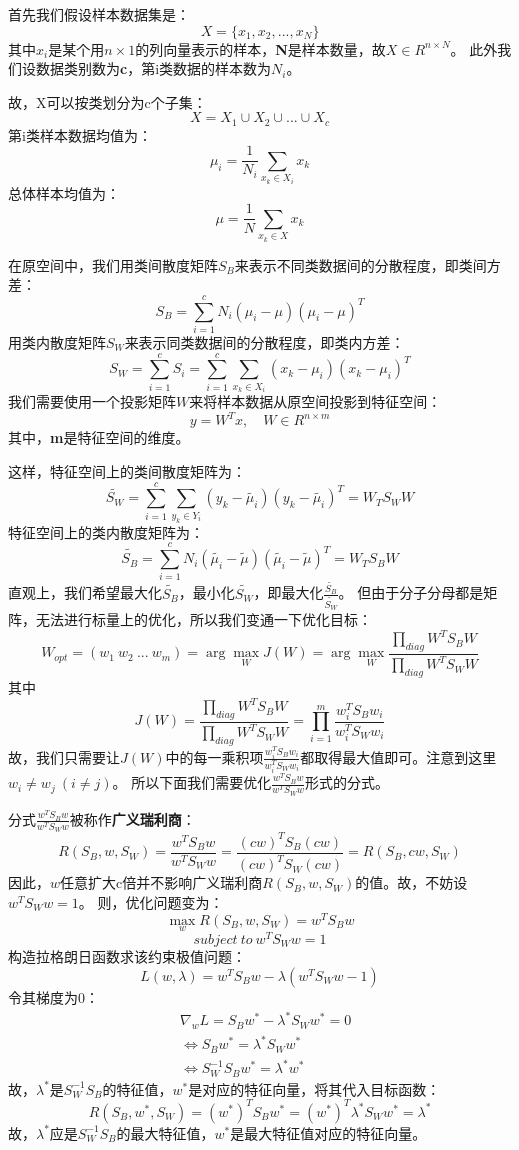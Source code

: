 \documentclass{ctexart}
\begin{document}
\noindent
首先我们假设样本数据集是：
$$
    X=\{x_1,x_2,...,x_N\}
$$
其中\textbf{$x_i$}是某个用$n\times1$的列向量表示的样本，\textbf{N}是样本数量，故$X\in R^{n\times N}$。
此外我们设数据类别数为\textbf{c}，第i类数据的样本数为\textbf{$N_i$}。

\noindent
故，X可以按类划分为c个子集：
$$
    X=X_1\cup X_2\cup ...\cup X_c
$$
第i类样本数据均值为：
$$
    \mu_i=\frac{1}{N_i}\sum_{x_k\in X_i}x_k
$$
总体样本均值为：
$$
    \mu=\frac{1}{N}\sum_{x_k\in X}x_k
$$

\noindent
在原空间中，我们用类间散度矩阵$S_B$来表示不同类数据间的分散程度，即类间方差：
$$
    S_{B}=\sum_{i=1}^{c} N_{i}\left(\mu_{i}-\mu\right)\left(\mu_{i}-\mu\right)^{T}
$$
用类内散度矩阵$S_W$来表示同类数据间的分散程度，即类内方差：
$$
    S_{W}=\sum_{i=1}^{c} S_{i}=\sum_{i=1}^{c} \sum_{x_{k} \in X_{i}}\left(x_{k}-\mu_{i}\right)\left(x_{k}-\mu_{i}\right)^{T}
$$
我们需要使用一个投影矩阵$W$来将样本数据从原空间投影到特征空间：
$$
    y = W^Tx,\quad W\in R^{n\times m}
$$
其中，\textbf{m}是特征空间的维度。

\noindent
这样，特征空间上的类间散度矩阵为：
$$
    \widetilde{S_W}=\sum_{i=1}^{c} \sum_{y_k \in Y_i}(y_k-\widetilde{\mu_i})(y_k-\widetilde{\mu_i})^T=W_TS_WW
$$
特征空间上的类内散度矩阵为：
$$
    \widetilde{S_B}=\sum_{i=1}^{c}N_i(\widetilde{\mu_i}-\widetilde{\mu})(\widetilde{\mu_i}-\widetilde{\mu})^T=W_TS_BW
$$
直观上，我们希望最大化$\widetilde{S_B}$，最小化$\widetilde{S_W}$，即最大化$\frac{\widetilde{S_B}}{\widetilde{S_W}}$。
但由于分子分母都是矩阵，无法进行标量上的优化，所以我们变通一下优化目标：
$$
    W_{opt}=(w_1\ w_2\ ...\ w_m)=\arg \max_W J(W)=\arg \max_W \frac{\prod_{diag} W^TS_BW}{\prod_{diag} W^TS_WW}
$$
其中
$$
    J(W)=\frac{\prod_{diag} W^TS_BW}{\prod_{diag} W^TS_WW}=\prod_{i=1}^{m}\frac{w_i^TS_Bw_i}{w_i^TS_Ww_i}
$$
故，我们只需要让$J(W)$中的每一乘积项$\frac{w_i^TS_Bw_i}{w_i^TS_Ww_i}$都取得最大值即可。注意到这里$w_i\neq w_j\ (i\neq j)$。
所以下面我们需要优化$\frac{w^TS_Bw}{w^TS_Ww}$形式的分式。

分式$\frac{w^TS_Bw}{w^TS_Ww}$被称作\textbf{广义瑞利商}：
$$
    R(S_B,w,S_W)=\frac{w^TS_Bw}{w^TS_Ww}=\frac{(cw)^TS_B(cw)}{(cw)^TS_W(cw)}=R(S_B,cw,S_W)
$$
因此，$w$任意扩大c倍并不影响广义瑞利商$R(S_B,w,S_W)$的值。故，不妨设$w^TS_Ww=1$。
则，优化问题变为：
$$
    \max_w R(S_B,w,S_W)=w^TS_Bw
$$
$$
    subject\ to\ w^TS_Ww=1
$$
构造拉格朗日函数求该约束极值问题：
$$
    L(w,\lambda)=w^TS_Bw-\lambda(w^TS_Ww-1)
$$
令其梯度为0：
\begin{equation}\nonumber
    \begin{split}
        &\nabla_wL=S_Bw^*-\lambda^* S_W w^*=0     \\
        &\Leftrightarrow S_Bw^*=\lambda^* S_W w^* \\
        &\Leftrightarrow S_W^{-1}S_Bw^*=\lambda^* w^*
    \end{split}
\end{equation}
故，$\lambda^*$是$S_W^{−1}S_B$的特征值，$w^*$是对应的特征向量，将其代入目标函数：
$$
    R(S_B,w^*,S_W)=(w^*)^TS_Bw^*=(w^*)^T\lambda^* S_W w^*=\lambda^*
$$
故，$\lambda^*$应是$S_W^{−1}S_B$的最大特征值，$w^*$是最大特征值对应的特征向量。
\end{document}

